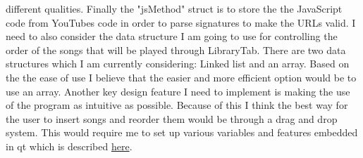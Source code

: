 \documentclass{article}
\begin{document}
different qualities.
Finally the "jsMethod" struct is to store the the JavaScript code from YouTubes code in
order to parse signatures to make the URLs valid.
I need to also consider the data structure I am going to use for controlling the order of
the songs that will be played through LibraryTab. There are two data structures which
I am currently considering: Linked list and an array.%
Based on the the ease of use I
believe that the easier and more efficient option would be to use an array.
Another key design feature I need to implement is making the use of the program as
intuitive as possible. Because of this I think the best way for the user to insert
songs and reorder them would be through a drag and drop system. This would require
me to set up various variables and features embedded in qt which is described
\href{http://doc.qt.io/qt-5/model-view-programming.html#using-drag-and-drop-with-item-views}
{here}.
\end{document}
